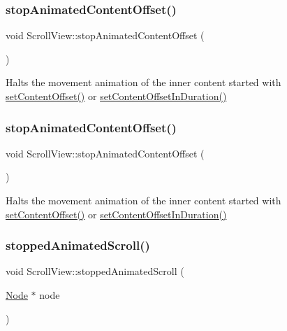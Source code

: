 \subsubsection{\texorpdfstring{stop\+Animated\+Content\+Offset()}{stopAnimatedContentOffset()}\hspace{0.1cm}{\footnotesize\ttfamily [1/2]}}
{\footnotesize\ttfamily void Scroll\+View\+::stop\+Animated\+Content\+Offset (\begin{DoxyParamCaption}{ }\end{DoxyParamCaption})}

Halts the movement animation of the inner content started with \hyperlink{classScrollView_ab8bc90e2fef0ba2e8ddf04778bb44dfe}{set\+Content\+Offset()} or \hyperlink{classScrollView_ad98397d42075b810de17c35eb9843ec7}{set\+Content\+Offset\+In\+Duration()} \mbox{\label{classScrollView_a13c84492be7e7c8e06a29f6bd3bdcc7e}} 
\subsubsection{\texorpdfstring{stop\+Animated\+Content\+Offset()}{stopAnimatedContentOffset()}\hspace{0.1cm}{\footnotesize\ttfamily [2/2]}}
{\footnotesize\ttfamily void Scroll\+View\+::stop\+Animated\+Content\+Offset (\begin{DoxyParamCaption}{ }\end{DoxyParamCaption})}

Halts the movement animation of the inner content started with \hyperlink{classScrollView_ab8bc90e2fef0ba2e8ddf04778bb44dfe}{set\+Content\+Offset()} or \hyperlink{classScrollView_ad98397d42075b810de17c35eb9843ec7}{set\+Content\+Offset\+In\+Duration()} \mbox{\label{classScrollView_a63f5487af2b0ff9b8a58dcb3921c9026}} 
\subsubsection{\texorpdfstring{stopped\+Animated\+Scroll()}{stoppedAnimatedScroll()}\hspace{0.1cm}{\footnotesize\ttfamily [1/2]}}
{\footnotesize\ttfamily void Scroll\+View\+::stopped\+Animated\+Scroll (\begin{DoxyParamCaption}\item[{\hyperlink{classNode}{Node} $\ast$}]{node }\end{DoxyParamCaption})\hspace{0.3cm}{\ttfamily [protected]}}

